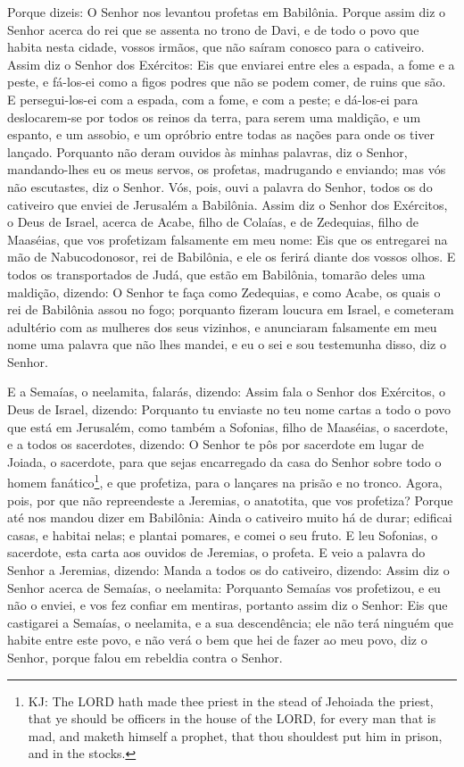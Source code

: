 Porque dizeis: O Senhor nos levantou profetas em Babilônia.
Porque assim diz o Senhor acerca do rei que se assenta no
trono de Davi, e de todo o povo que habita nesta cidade, vossos
irmãos, que não saíram conosco para o cativeiro. Assim diz o
Senhor dos Exércitos: Eis que enviarei entre eles a espada, a fome e
a peste, e fá-los-ei como a figos podres que não se podem comer, de
ruins que são. E persegui-los-ei com a espada, com a fome, e
com a peste; e dá-los-ei para deslocarem-se por todos os reinos da
terra, para serem uma maldição, e um espanto, e um assobio, e um
opróbrio entre todas as nações para onde os tiver lançado.
Porquanto não deram ouvidos às minhas palavras, diz o Senhor,
mandando-lhes eu os meus servos, os profetas, madrugando e enviando;
mas vós não escutastes, diz o Senhor. Vós, pois, ouvi a
palavra do Senhor, todos os do cativeiro que enviei de Jerusalém a
Babilônia. Assim diz o Senhor dos Exércitos, o Deus de
Israel, acerca de Acabe, filho de Colaías, e de Zedequias, filho de
Maaséias, que vos profetizam falsamente em meu nome: Eis que os
entregarei na mão de Nabucodonosor, rei de Babilônia, e ele os
ferirá diante dos vossos olhos. E todos os transportados de
Judá, que estão em Babilônia, tomarão deles uma maldição, dizendo: O
Senhor te faça como Zedequias, e como Acabe, os quais o rei de
Babilônia assou no fogo; porquanto fizeram loucura em Israel,
e cometeram adultério com as mulheres dos seus vizinhos, e
anunciaram falsamente em meu nome uma palavra que não lhes mandei, e
eu o sei e sou testemunha disso, diz o Senhor.

E a Semaías, o neelamita, falarás, dizendo: Assim fala o
Senhor dos Exércitos, o Deus de Israel, dizendo: Porquanto tu
enviaste no teu nome cartas a todo o povo que está em Jerusalém,
como também a Sofonias, filho de Maaséias, o sacerdote, e a todos os
sacerdotes, dizendo: O Senhor te pôs por sacerdote em lugar
de Joiada, o sacerdote, para que sejas encarregado da casa do Senhor
sobre todo o homem fanático\footnote{KJ: The LORD hath made thee
priest in the stead of Jehoiada the priest, that ye should be
officers in the house of the LORD, for every man that is mad, and
maketh himself a prophet, that thou shouldest put him in prison, and
in the stocks.}, e que profetiza, para o lançares na prisão e no
tronco. Agora, pois, por que não repreendeste a Jeremias, o
anatotita, que vos profetiza? Porque até nos mandou dizer em
Babilônia: Ainda o cativeiro muito há de durar; edificai casas, e
habitai nelas; e plantai pomares, e comei o seu fruto. E leu
Sofonias, o sacerdote, esta carta aos ouvidos de Jeremias, o
profeta. E veio a palavra do Senhor a Jeremias, dizendo:
Manda a todos os do cativeiro, dizendo: Assim diz o Senhor
acerca de Semaías, o neelamita: Porquanto Semaías vos profetizou, e
eu não o enviei, e vos fez confiar em mentiras, portanto
assim diz o Senhor: Eis que castigarei a Semaías, o neelamita, e a
sua descendência; ele não terá ninguém que habite entre este povo, e
não verá o bem que hei de fazer ao meu povo, diz o Senhor, porque
falou em rebeldia contra o Senhor.

